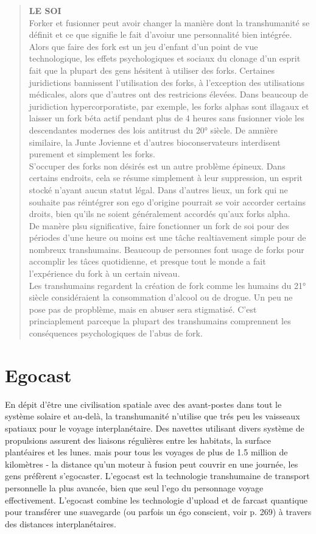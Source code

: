 \begin{quotation} \textbf{LE SOI} \\ Forker et fusionner peut avoir changer la manière dont la transhumanité se définit et ce que signifie le fait d'avoiur une personnalité bien intégrée. \\ Alors que faire des fork est un jeu d'enfant d'un point de vue technologique, les effets psychologiques et sociaux du clonage d'un esprit fait que la plupart des gens hésitent à utiliser des forks. Certaines juridictions bannissent l'utilisation des forks, à l'exception des utilisations médicales, alors que d'autres ont des restricions élevées. Dans beaucoup de juridiction hypercorporatiste, par exemple, les forks alphas sont illagaux et laisser un fork béta actif pendant plus de 4 heures sans fusionner viole les descendantes modernes des lois antitrust du 20° siècle. De amnière similaire, la Junte Jovienne et d'autres bioconservateurs interdisent purement et simplement les forks. \\ S'occuper des forks non désirés est un autre problème épineux. Dans certains endroits, cela se résume simplement à leur suppression, un esprit stocké n'ayant aucun statut légal. Dans d'autres lieux, un fork qui ne souhaite pas réintégrer son ego d'origine pourrait se voir accorder certains droits, bien qu'ils ne soient généralement accordés qu'aux forks alpha. \\ De manère plsu significative, faire fonctionner un fork de soi pour des périodes d'une heure ou moins est une tâche realtiavement simple pour de nombreux transhumains. Beaucoup de personnes font usage de forks pour accomplir les tâces quotidienne, et presque tout le monde a fait l'expérience du fork à un certain niveau. \\ Les transhumains regardent la création de fork comme les humains du 21° siècle considéraient la consommation d'alcool ou de drogue. Un peu ne pose pas de propblème, mais en abuser sera stigmatisé. C'est princiaplement parceque la plupart des transhumains comprennent les conséquences psychologiques de l'abus de fork. \end{quotation} 

\section{Egocast} 

En dépit d'être une civilisation spatiale avec des avant-postes dans tout le système solaire et au-delà, la transhumanité n'utilise que trés peu les vaisseaux spatiaux pour le voyage interplanétaire. Des navettes utilisant divers système de propulsions assurent des liaisons régulières entre les habitats, la surface plantéaires et les lunes. mais pour tous les voyages de plus de 1.5 million de kilomètres - la distance qu'un moteur à fusion peut couvrir en une journée, les gens préfèrent s'egocaster. L'egocast est la technologie transhumaine de transport personnelle la plus avancée, bien que seul l'ego du personnage voyage effectivement. L'egocast combine les technologie d'upload et de farcast quantique pour transférer une suavegarde (ou parfois un égo conscient, voir p. 269) à travers des distances interplanétaires. 



